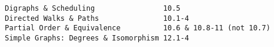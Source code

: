 \documentclass[handout]{mcs}
\begin{document}
\renewcommand{\reading}{
  \begin{itemize}
  \item
    Chapter~\bref{dag_sec}. \emph{Digraphs \& Scheduling}
  \item
    Chapter~\bref{dag_degree_sec}--\bref{walk_relation_sec}. \emph{Directed Walks \& Paths}
  \item
    Chapter~\bref{partial_order_sec} \& \bref{linear_order_sec}--\bref{prop_summary_sec}. \emph{Partial Order \& Equivalence}
  \item 
    Chapter~\bref{degreessec}--\bref{isomorphism_sec}. \emph{Simple Graphs: Degrees \& Isomorphism}
  \end{itemize}
}


\begin{staffnotes}
\begin{verbatim}
Digraphs & Scheduling                10.5
Directed Walks & Paths               10.1-4
Partial Order & Equivalence          10.6 & 10.8-11 (not 10.7)
Simple Graphs: Degrees & Isomorphism 12.1-4 
\end{verbatim}
\end{staffnotes}








\end{document}
